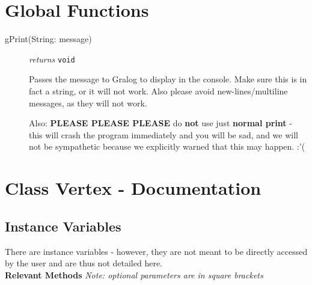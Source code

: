 \section{Global Functions}
\begin{description}


\item[gPrint(String: message)] \emph{returns} \texttt{void}

Passes the message to Gralog to display in the console. Make sure this is in fact a string, or it will not work. Also please avoid new-lines/multiline messages, as they will not work.

Also: \textbf{PLEASE PLEASE PLEASE} do \textbf{not} use just \textbf{normal print} - this will crash the program immediately and you will be sad, and we will not be sympathetic because we explicitly warned that this may happen. :'(
\end{description}

\section{Class Vertex - Documentation}

\subsection{Instance Variables}
There are instance variables - however, they are not meant to be directly accessed by the user and are thus not detailed here.\\

\textbf{{\large Relevant Methods}}
\textit{Note: optional parameters are in square brackets}
